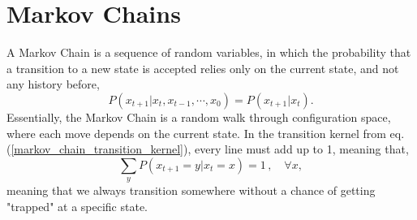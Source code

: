 \documentclass{book}
\begin{document}
	\section{Markov Chains}
	A Markov Chain is a sequence of random variables, in which the probability that a transition to a new state is accepted relies only on the current state, and not any history before,
	\begin{equation}
		\label{markov_chain_transition_kernel}
		P(x_{t+1} | x_t,x_{t-1},\cdots,x_0)=P(x_{t+1}|x_t).
	\end{equation}
	Essentially, the Markov Chain is a random walk through configuration space, where each move depends on the current state. In the transition kernel from eq.(\ref{markov_chain_transition_kernel}), every line must add up to 1, meaning that,
	\begin{equation*}
		\sum_{y} P(x_{t+1}=y | x_t =x ) = 1 \, , \quad \forall x,
	\end{equation*}
	meaning that we always transition somewhere without a chance of getting "trapped" at a specific state.
\end{document}
